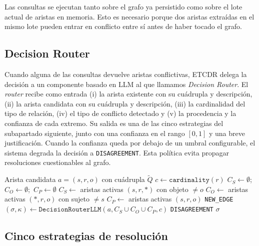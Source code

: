 Las consultas se ejecutan tanto sobre el grafo ya persistido como sobre el lote actual de aristas en memoria. Esto es necesario porque dos aristas extraídas en el mismo lote pueden entrar en conflicto entre sí antes de haber tocado el grafo.

\subsection{Decision Router}

Cuando alguna de las consultas devuelve aristas conflictivas, ETCDR delega la decisión a un componente basado en LLM al que llamamos \emph{Decision Router}. El \emph{router} recibe como entrada (i) la arista existente con su cuádrupla y descripción, (ii) la arista candidata con su cuádrupla y descripción, (iii) la cardinalidad del tipo de relación, (iv) el tipo de conflicto detectado y (v) la procedencia y la confianza de cada extremo. Su salida es una de las cinco estrategias del subapartado siguiente, junto con una confianza en el rango $[0, 1]$ y una breve justificación. Cuando la confianza queda por debajo de un umbral configurable, el sistema degrada la decisión a \texttt{DISAGREEMENT}. Esta política evita propagar resoluciones cuestionables al grafo.

\begin{algorithm}
\caption{Resolución de un candidato en ETCDR}\label{alg:etcdr}
\begin{algorithmic}[1]
\Require Arista candidata $a = (s, r, o)$ con cuádrupla $\widetilde{Q}$
\State $c \gets \texttt{cardinality}(r)$
\State $C_S \gets \emptyset$;\, $C_O \gets \emptyset$;\, $C_P \gets \emptyset$
    \State $C_S \gets$ aristas activas $(s, r, *)$ con objeto $\neq o$
\EndIf
{}
    \State $C_O \gets$ aristas activas $(*, r, o)$ con sujeto $\neq s$
\EndIf
\State $C_P \gets$ aristas activas $(s, r, o)$
    \State \Return \texttt{NEW\_EDGE}
\EndIf
\State $(\sigma, \kappa) \gets \texttt{DecisionRouterLLM}(a, C_S \cup C_O \cup C_P, c)$
    \State \Return \texttt{DISAGREEMENT}
\EndIf
\State \Return $\sigma$
\end{algorithmic}
\end{algorithm}

\subsection{Cinco estrategias de resolución}

